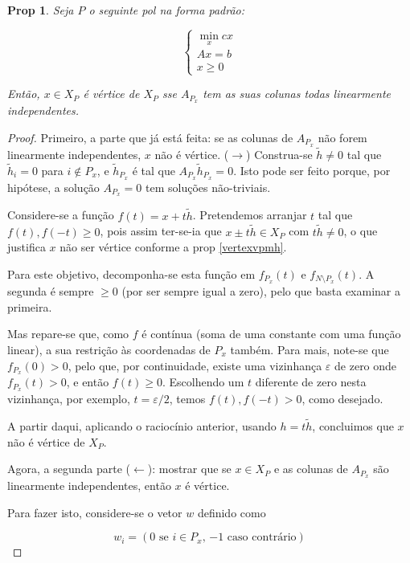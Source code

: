 \documentclass{article}
\newtheorem{prop}{Prop}
\theoremstyle{definition}
\begin{document}
	\begin{prop}
	Seja $P$ o seguinte pol na forma padrão:
	
	\[
	\begin{cases}
	\min\limits_x cx\\
	Ax = b\\
	x \geq 0
	\end{cases}
	\]
	
	Então, $x \in X_P$ é vértice de $X_P$ sse $A_{P_x}$ tem as suas colunas todas linearmente independentes.
	\end{prop}
	
	\begin{proof}
	Primeiro, a parte que já está feita: se as colunas de $A_{P_x}$ não forem linearmente independentes, $x$ não é vértice. ($\rightarrow$) Construa-se $\tilde h \neq 0$ tal que $\tilde h_i = 0$ para $i \not \in P_x$, e $\tilde h_{P_x}$ é tal que $A_{P_x} \tilde h_{P_x} = 0$. Isto pode ser feito porque, por hipótese, a solução $A_{P_x} = 0$ tem soluções não-triviais.
	
	Considere-se a função $f(t) = x + t \tilde h$. Pretendemos arranjar $t$ tal que \allowbreak ${f(t), f(-t) \geq 0}$, pois assim ter-se-ia que $x \pm t \tilde h \in X_P$ com $t \tilde h \neq 0$, o que justifica $x$ não ser vértice conforme a prop \ref{vertexvpmh}.
	
	Para este objetivo, decomponha-se esta função em $f_{P_x}(t)$ e $f_{N \setminus P_x}(t)$. A segunda é sempre $\geq 0$ (por ser sempre igual a zero), pelo que basta examinar a primeira.
	
	Mas repare-se que, como $f$ é contínua (soma de uma constante com uma função linear), a sua restrição às coordenadas de $P_x$ também. Para mais, note-se que $f_{P_x}(0) > 0$, pelo que, por continuidade, existe uma vizinhança $\varepsilon$ de zero onde $f_{P_x}(t) > 0$, e então $f(t) \geq 0$. Escolhendo um $t$ diferente de zero nesta vizinhança, por exemplo, $t = \varepsilon/2$, temos $f(t), f(-t) > 0$, como desejado.
	
	A partir daqui, aplicando o raciocínio anterior, usando $h = t \tilde h$, concluimos que $x$ não é vértice de $X_P$.
	
	Agora, a segunda parte ($\leftarrow$): mostrar que se $x \in X_P$ e as colunas de $A_{P_x}$ são linearmente independentes, então $x$ é vértice.
	
	Para fazer isto, considere-se o vetor $w$ definido como
	
	\[w_i = (\text{$0$ se $i \in P_x$, $-1$ caso contrário})\]
	

\end{proof}
\end{document}

